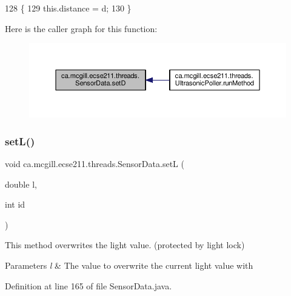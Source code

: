\begin{DoxyCode}
128                              \{
129       this.distance = d;
130   \}
\end{DoxyCode}
Here is the caller graph for this function\+:
\nopagebreak
\begin{figure}[H]
\begin{center}
\leavevmode
\includegraphics[width=350pt]{classca_1_1mcgill_1_1ecse211_1_1threads_1_1_sensor_data_a2c1f8e625478b89aabe6e9911e482ef3_icgraph}
\end{center}
\end{figure}
\mbox{\label{classca_1_1mcgill_1_1ecse211_1_1threads_1_1_sensor_data_a1c2c38354fc5a66b4667e1d47ab6b20b}} 
\subsubsection{\texorpdfstring{set\+L()}{setL()}}
{\footnotesize\ttfamily void ca.\+mcgill.\+ecse211.\+threads.\+Sensor\+Data.\+setL (\begin{DoxyParamCaption}\item[{double}]{l,  }\item[{int}]{id }\end{DoxyParamCaption})}

This method overwrites the light value. (protected by light lock)


\begin{DoxyParams}{Parameters}
{\em l} & The value to overwrite the current light value with \\
\hline
\end{DoxyParams}


Definition at line 165 of file Sensor\+Data.\+java.


